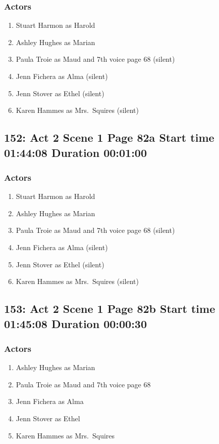 \subsubsection{Actors}
\begin{enumerate}
\item Stuart Harmon as Harold
\item Ashley Hughes as Marian
\item Paula Troie as Maud and 7th voice page 68 (silent)
\item Jenn Fichera as Alma (silent)
\item Jenn Stover as Ethel (silent)
\item Karen Hammes as Mrs.~Squires (silent)
\end{enumerate}


\subsection{152: Act 2 Scene 1 Page 82a Start time 01:44:08 Duration 00:01:00}

\subsubsection{Actors}
\begin{enumerate}
\item Stuart Harmon as Harold
\item Ashley Hughes as Marian
\item Paula Troie as Maud and 7th voice page 68 (silent)
\item Jenn Fichera as Alma (silent)
\item Jenn Stover as Ethel (silent)
\item Karen Hammes as Mrs.~Squires (silent)
\end{enumerate}


\subsection{153: Act 2 Scene 1 Page 82b Start time 01:45:08 Duration 00:00:30}

\subsubsection{Actors}
\begin{enumerate}
\item Ashley Hughes as Marian
\item Paula Troie as Maud and 7th voice page 68
\item Jenn Fichera as Alma
\item Jenn Stover as Ethel
\item Karen Hammes as Mrs.~Squires
\end{enumerate}

